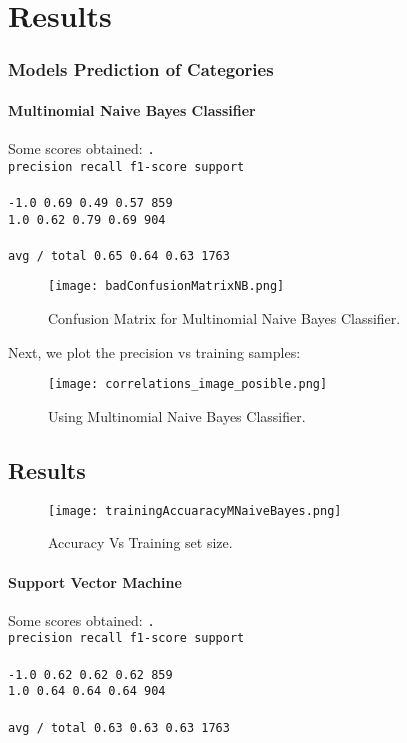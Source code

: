 
\chapter{Results}
\label{ch:results}

\subsection{Models Prediction of Categories}
\subsubsection{Multinomial Naive Bayes Classifier}
Some scores obtained:
\texttt{.\\
             precision    recall  f1-score   support \\
\\
       -1.0       0.69      0.49      0.57       859\\
        1.0       0.62      0.79      0.69       904\\
\\
avg / total       0.65      0.64      0.63      1763\\
}

\begin{figure}[h]
	\label{fig:nbConfusion}
	\texttt{[image: badConfusionMatrixNB.png]}
    \caption{Confusion Matrix for Multinomial Naive Bayes Classifier.}
\end{figure}

Next, we plot the precision vs training samples:

\begin{figure}[h]
	\label{fig:correlaciones}
	\texttt{[image: correlations\_image\_posible.png]}
    \caption{Using Multinomial Naive Bayes Classifier.}
\end{figure}


%
\section{Results}
%
\begin{figure}[h]
	\label{fig:partialResults1}
	\texttt{[image: trainingAccuaracyMNaiveBayes.png]}
    \caption{Accuracy Vs Training set size.}
\end{figure}


\subsubsection{Support Vector Machine}
Some scores obtained:
\texttt{.\\
     precision    recall  f1-score   support\\
\\
       -1.0       0.62      0.62      0.62       859\\
        1.0       0.64      0.64      0.64       904\\
\\
avg / total       0.63      0.63      0.63      1763\\
}